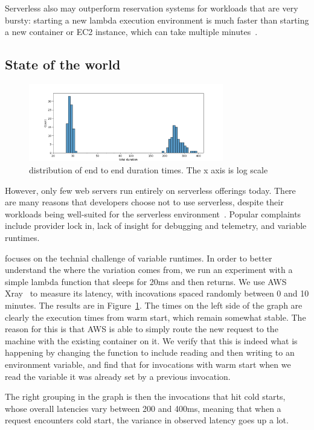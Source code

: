 Serverless also may outperform reservation systems for workloads that are very
bursty: starting a new lambda execution environment is much faster than starting
a new container or EC2 instance, which can take multiple
minutes~\cite{ec2-autoscaling}.


\subsection{State of the world}


\begin{figure}[t!]
    \centering
      \includegraphics[width=8.5cm]{img/lambda_total_durations.png}
      \caption{ distribution of end to end duration times. The x axis is log scale }
    \label{fig:lambda-total-durations}
\end{figure}

However, only few web servers run entirely on serverless offerings today. There
are many reasons that developers choose not to use serverless, despite their
workloads being well-suited for the serverless
environment~\cite{not-lambda-blog,reddit-serverless2}. Popular complaints
include provider lock in, lack of insight for debugging and telemetry, and
variable runtimes.


\Sys{} focuses on the technial challenge of variable runtimes. In order to
better understand the where the variation comes from, we run an experiment with
a simple lambda function that sleeps for 20ms and then returns. We use AWS
Xray~\cite{aws-xray} to measure its latency, with incovations spaced randomly
between 0 and 10 minutes. The results are in
Figure~\ref{fig:lambda-total-durations}. The times on the left side of the graph
are clearly the execution times from warm start, which remain somewhat stable.
The reason for this is that AWS is able to simply route the new request to the
machine with the existing container on it. We verify that this is indeed what is
happening by changing the function to include reading and then writing to an
environment variable, and find that for invocations with warm start when we read
the variable it was already set by a previous invocation.

The right grouping in the graph is then the invocations that hit cold starts,
whose overall latencies vary between 200 and 400ms, meaning that when a request
encounters cold start, the variance in observed latency goes up a lot.

